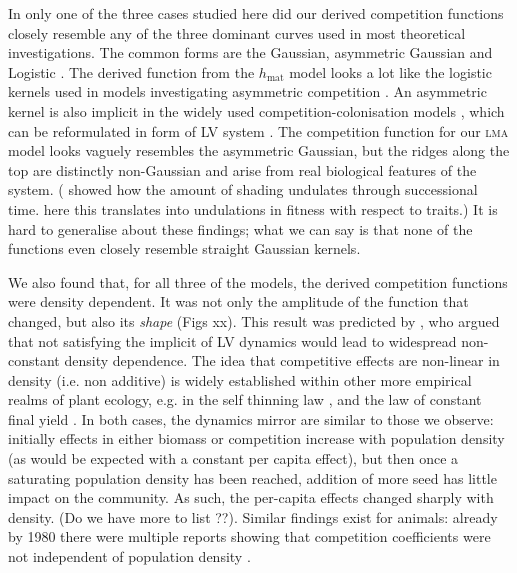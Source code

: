 \documentclass[a4paper,11pt]{article}
\begin{document}
In only one of the three cases studied here did our derived competition
functions closely resemble any of the three dominant curves used in most
theoretical investigations. The common forms are the Gaussian, asymmetric
Gaussian \citet{Roughgarden-1979} and Logistic  \citep[e.g.][]{Kisdi-1999,
Law-1997}. The derived function from the $h_\mathrm{mat}$ model looks a lot
like the logistic kernels used in models investigating asymmetric competition
\citep{Kisdi-1999, Law-1997}.  An asymmetric kernel is also implicit in
the widely used competition-colonisation models  \citep{Geritz-1999,
Calcagno-2006}, which can be reformulated in form of LV system
\citep{Calcagno-2006}. The competition function for our \textsc{lma} model looks
vaguely resembles the asymmetric Gaussian, but the ridges along the top are
distinctly non-Gaussian and arise from real biological features of the system. 
(\citet{Falster-2011} showed how the amount of shading undulates through 
successional time. here this translates into undulations in fitness with
respect to traits.) It is hard to generalise about these findings; what we
can say is that none of the functions even closely resemble straight Gaussian
kernels. 

We also found that, for all three of the models, the derived competition
functions were density dependent. It was not only the amplitude of the
function that changed, but also its \emph{shape} (Figs xx). This result was
predicted by \citet{Abrams-1980}, who argued that not satisfying the implicit
of LV dynamics would lead to widespread non-constant density dependence. The
idea that competitive effects are non-linear in density (i.e. non additive) is
widely established within other more empirical realms of plant ecology, e.g.
in the self thinning law \citep{Westoby-1984}, and the law of constant final
yield \citep{Weiner-2010}. In both cases, the dynamics mirror are similar to
those we observe: initially effects in either biomass or competition increase with population
density (as would be expected with a constant per capita effect), but then
once a saturating population density has been reached, addition of more seed
has little impact on the community. As such, the per-capita effects changed
sharply with density. (Do we have more to list ??). Similar findings
exist for animals: already by 1980 there were  multiple reports showing that
competition coefficients were not independent of population density
\citep{Abrams-1980}.
\end{document}
